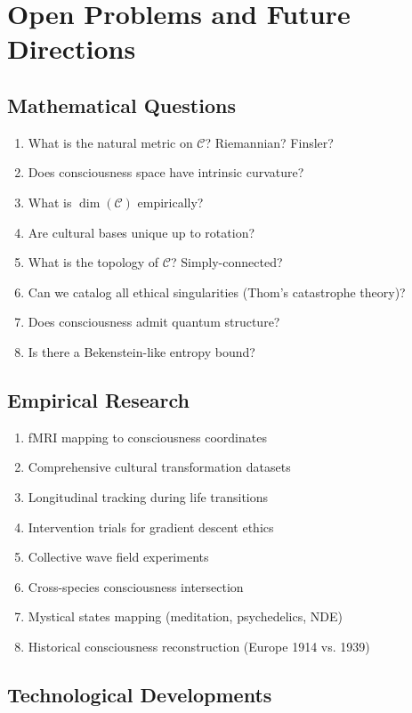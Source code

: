 \documentclass[11pt,a4paper]{article}
\theoremstyle{definition}
\theoremstyle{remark}
\newcommand{\CC}{\mathcal{C}}
\begin{document}
\section{Open Problems and Future Directions}

\subsection{Mathematical Questions}

\begin{enumerate}[label=\textbf{Q\arabic*:}]
\item What is the natural metric on $\CC$? Riemannian? Finsler?
\item Does consciousness space have intrinsic curvature?
\item What is $\dim(\CC)$ empirically?
\item Are cultural bases unique up to rotation?
\item What is the topology of $\CC$? Simply-connected?
\item Can we catalog all ethical singularities (Thom's catastrophe theory)?
\item Does consciousness admit quantum structure?
\item Is there a Bekenstein-like entropy bound?
\end{enumerate}

\subsection{Empirical Research}

\begin{enumerate}[label=\textbf{E\arabic*:}]
\item fMRI mapping to consciousness coordinates
\item Comprehensive cultural transformation datasets
\item Longitudinal tracking during life transitions
\item Intervention trials for gradient descent ethics
\item Collective wave field experiments
\item Cross-species consciousness intersection
\item Mystical states mapping (meditation, psychedelics, NDE)
\item Historical consciousness reconstruction (Europe 1914 vs. 1939)
\end{enumerate}

\subsection{Technological Developments}
\end{document}
